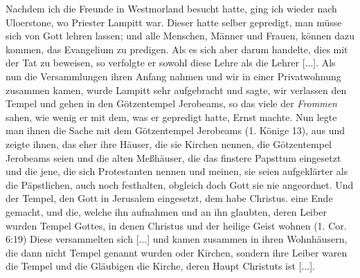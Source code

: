 Nachdem ich die Freunde in Westmorland besucht hatte, ging
ich wieder nach Uloerstone, wo Priester 
Lampitt war. Dieser
hatte selber gepredigt, man müsse sich von Gott lehren lassen;
und alle Menschen, Männer und Frauen, können dazu kommen,
das Evangelium zu predigen. Als es sich aber darum handelte,
dies mit der Tat zu beweisen, so verfolgte er sowohl diese Lehre
als die Lehrer [...]. Als nun die Versammlungen ihren Anfang
nahmen und wir in einer Privatwohnung zusammen kamen, wurde
Lampitt sehr aufgebracht und sagte, wir verlassen den Tempel
und gehen in den Götzentempel Jerobeams, so das viele der
\textit{Frommen} sahen, wie wenig er mit dem, was er gepredigt hatte,
Ernst machte. Nun legte man ihnen die Sache mit dem 
Götzentempel Jerobeams 
(1. Könige 13), aus 
und zeigte ihnen, das
eher ihre Häuser, die sie Kirchen nennen, die Götzentempel 
Jerobeams seien und die alten Meßhäuser, die das 
finstere Papsttum
eingesetzt und die jene, die sich 
Protestanten nennen und meinen,
sie seien aufgeklärter als die Päpstlichen, auch noch festhalten,
obgleich doch Gott sie nie angeordnet. Und der 
Tempel, den
Gott in Jerusalem eingesetzt, dem habe Christus. eine Ende 
gemacht, und die, welche ihn aufnahmen und an ihn glaubten, deren
Leiber wurden Tempel Gottes, in denen Christus und der heilige
Geist wohnen (1. Cor. 6:19) 
Diese versammelten sich [...]
und kamen zusammen in ihren Wohnhäusern, die dann nicht
Tempel genannt wurden oder Kirchen, sondern ihre Leiber waren
die Tempel und die Gläubigen die Kirche, deren Haupt Christuts
ist [...]. 

